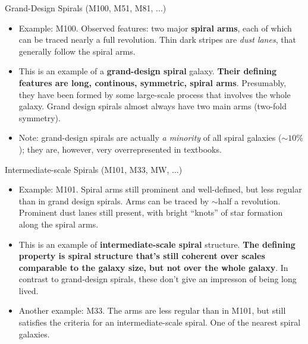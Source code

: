 \documentclass[letterpaper,landscape]{slides}
\begin{document}
\begin{slide}
\begin{center}
{\large \color{red} 
                  Grand-Design Spirals (M100, M51, M81, ...)  }
\end{center}

\begin{itemize}
\item Example: M100. Observed features: two major {\bf spiral arms}, each of which can be traced nearly a full revolution. Thin dark
stripes are {\em dust lanes}, that generally follow the spiral arms.
\item This is an example of a {\bf grand-design spiral} galaxy. {\bf Their defining 
features are long, continous, symmetric, spiral arms}. Presumably,
they have been formed by some large-scale process that involves the whole
galaxy. Grand design spirals almost always have two main arms (two-fold symmetry). 
\item Note: grand-design spirals are actually {\em a minority} of all spiral
galaxies ($\sim 10\%$); they are, however, very overrepresented in textbooks.
\end{itemize}

\vfill
\end{slide}


\begin{slide}
\begin{center}
{\large \color{red} 
                  Intermediate-scale Spirals (M101, M33, MW, ...)  }
\end{center}

\begin{itemize}
\item Example: M101. Spiral arms still prominent and well-defined, but less
regular than in grand design spirals. Arms can be traced by $\sim$half a
revolution. Prominent dust lanes still present, with bright ``knots'' of
star formation along the spiral arms.

\item This is an example of {\bf intermediate-scale spiral} structure.
{\bf The defining property is spiral structure that's still coherent over
scales comparable to the galaxy size, but not over the whole galaxy}. In
contrast to grand-design spirals, these don't give an impresson of being
long lived.

\item Another example: M33. The arms are less regular than in M101, but
still satisfies the criteria for an intermediate-scale spiral. One of the
nearest spiral galaxies.
\end{itemize}

\vfill
\end{slide}
\end{document}
